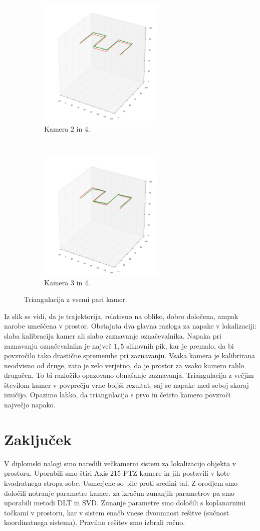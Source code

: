 \documentclass[a4paper, 12pt]{book}
\begin{document}
\begin{figure}
    \begin{subfigure}[t]{0.5\textwidth}
        \centering
        \includegraphics[width=6cm]{24.png}
        \caption{Kamera 2 in 4.}
    \end{subfigure}~
    \begin{subfigure}[t]{0.5\textwidth}
        \centering
        \includegraphics[width=6cm]{34.png}
        \caption{Kamera 3 in 4.}
    \end{subfigure}
    \caption{Triangulacija z vsemi pari kamer.}
\end{figure}

Iz slik se vidi, da je trajektorija, relativno na obliko, dobro določena, ampak narobe umeščena v prostor. Obstajata dva glavna razloga za napake v lokalizaciji: slaba kalibracija kamer ali slabo zaznavanje označevalnika. Napaka pri zaznavanju označevalnika je največ $1,5$ slikovnih pik, kar je premalo, da bi povzročilo tako drastične spremembe pri zaznavanju. Vsaka kamera je kalibrirana neodvisno od druge, zato je zelo verjetno, da je prostor za vsako kamero rahlo drugačen. To bi razložilo opazovano obnašanje zaznavanja. Triangulacija z večjim številom kamer v povprečju vrne boljši rezultat, saj se napake med seboj skoraj izničijo. Opazimo lahko, da triangulacija s prvo in četrto kamero povzroči največjo napako. 

\chapter{Zaključek}
V diplomski nalogi smo naredili večkamerni sistem za lokalizacijo objekta v prostoru. Uporabili smo štiri Axis 215 PTZ kamere in jih postavili v kote kvadratnega stropa sobe. Usmerjene so bile proti sredini tal. Z orodjem smo določili notranje parametre kamer, za izračun zunanjih parametrov pa smo uporabili metodi DLT in SVD. Zunanje parametre smo določili s koplanarnimi točkami v prostoru, kar v sistem enačb vnese dvoumnost rešitve (sučnost koordinatnega sistema). Pravilno rešitev smo izbrali ročno. 
\end{document}
